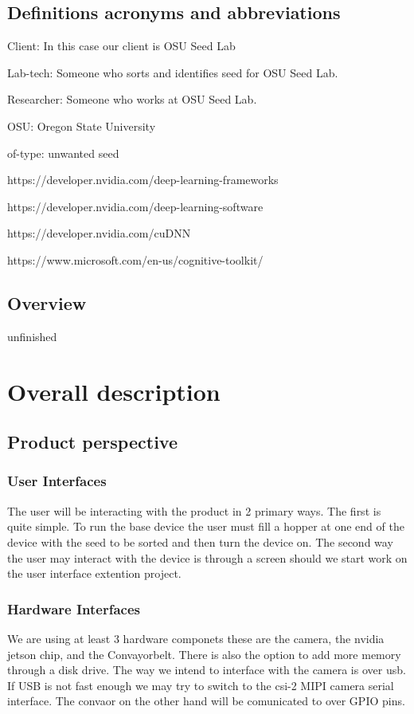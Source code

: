 \documentclass[onecolumn, draftclsnofoot,10pt, compsoc]{IEEEtran}
\begin{document}
\subsection{Definitions acronyms and abbreviations}

Client: In this case our client is OSU Seed Lab

Lab-tech: Someone who sorts and identifies seed for OSU Seed Lab.

Researcher: Someone who works at OSU Seed Lab.

OSU: Oregon State University

of-type: unwanted seed

https://developer.nvidia.com/deep-learning-frameworks

https://developer.nvidia.com/deep-learning-software

https://developer.nvidia.com/cuDNN

https://www.microsoft.com/en-us/cognitive-toolkit/
\subsection{Overview}
unfinished

\section{Overall description}

\subsection{Product perspective}

\subsubsection{User Interfaces}
The user will be interacting with the product in 2 primary ways.
The first is quite simple.
To run the base device the user must fill a hopper at one end of the device with the seed to be sorted and then turn the device on.
The second way the user may interact with the device is through a screen should we start work on the user interface extention project.
\subsubsection{Hardware Interfaces}
We are using at least 3 hardware componets these are the camera, the nvidia jetson chip, and the Convayorbelt.
There is also the option to add more memory through a disk drive.
The way we intend to interface with the camera is over usb.
If USB is not fast enough we may try to switch to the csi-2 MIPI camera serial interface.
The convaor on the other hand will be comunicated to over GPIO pins.
\end{document}

